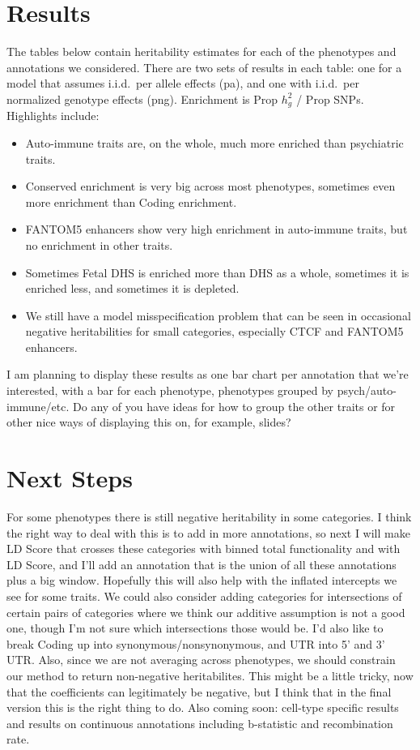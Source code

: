 \documentclass[11pt]{article}
\begin{document}
\section{Results}
The tables below contain heritability estimates for each of the phenotypes and annotations we considered. There are two sets of results in each table: one for a model that assumes i.i.d.\ per allele effects (pa), and one with i.i.d.\ per normalized genotype effects (png). Enrichment is Prop $h^2_g$ / Prop SNPs. Highlights include:
\begin{itemize}
\item Auto-immune traits are, on the whole, much more enriched than psychiatric traits.
\item Conserved enrichment is very big across most phenotypes, sometimes even more enrichment than Coding enrichment.
\item FANTOM5 enhancers show very high enrichment in auto-immune traits, but no enrichment in other traits.
\item Sometimes Fetal DHS is enriched more than DHS as a whole, sometimes it is enriched less, and sometimes it is depleted.
\item We still have a model misspecification problem that can be seen in occasional negative heritabilities for small categories, especially CTCF and FANTOM5 enhancers. 
\end{itemize}
I am planning to display these results as one bar chart per annotation that we're interested, with a bar for each phenotype, phenotypes grouped by psych/auto-immune/etc. Do any of you have ideas for how to group the other traits or for other nice ways of displaying this on, for example, slides?

\section{Next Steps}
For some phenotypes there is still negative heritability in some categories. I think the right way to deal with this is to add in more annotations, so next I will make LD Score that crosses these categories with binned total functionality and with LD Score, and I'll add an annotation that is the union of all these annotations plus a big window. Hopefully this will also help with the inflated intercepts we see for some traits. We could also consider adding categories for intersections of certain pairs of categories where we think our additive assumption is not a good one, though I'm not sure which intersections those would be. I'd also like to break Coding up into synonymous/nonsynonymous, and UTR into 5' and 3' UTR. Also, since we are not averaging across phenotypes, we should constrain our method to return non-negative heritabilites. This might be a little tricky, now that the coefficients can legitimately be negative, but I think that in the final version this is the right thing to do. Also coming soon: cell-type specific results and results on continuous annotations including b-statistic and recombination rate.
\end{document}
